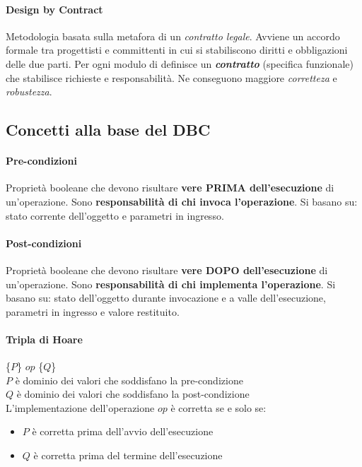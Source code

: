 \paragraph{Design by Contract} Metodologia basata sulla metafora di un \textit{contratto legale}. Avviene un accordo formale tra progettisti e committenti in cui si stabiliscono diritti e obbligazioni delle due parti. Per ogni modulo di definisce un \textbf{\textit{contratto}} (specifica funzionale) che stabilisce richieste e responsabilità. Ne conseguono maggiore \textit{corretteza} e \textit{robustezza}.

\subsection{Concetti alla base del DBC}

\paragraph{Pre-condizioni} Proprietà booleane che devono risultare \textbf{vere PRIMA dell'esecuzione} di un'operazione. Sono \textbf{responsabilità di chi invoca l'operazione}. Si basano su: stato corrente dell'oggetto e parametri in ingresso.

\paragraph{Post-condizioni} Proprietà booleane che devono risultare \textbf{vere DOPO dell'esecuzione} di un'operazione. Sono \textbf{responsabilità di chi implementa l'operazione}. Si basano su: stato dell'oggetto durante invocazione e a valle dell'esecuzione, parametri in ingresso e valore restituito.

\paragraph{Tripla di Hoare} \{$P$\} $op$ \{$Q$\}\\
$P$ è dominio dei valori che soddisfano la pre-condizione\\
$Q$ è dominio dei valori che soddisfano la post-condizione\\
L'implementazione dell'operazione $op$ è corretta se e solo se:
\begin{itemize}
    \item $P$ è corretta prima dell'avvio dell'esecuzione
    \item $Q$ è corretta prima del termine dell'esecuzione
\end{itemize}

